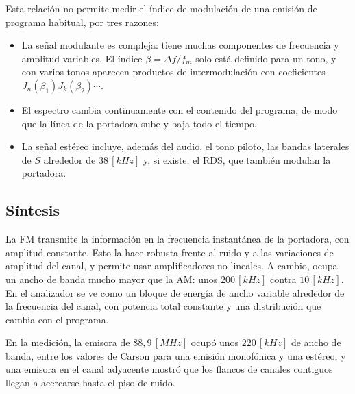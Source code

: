 Esta relación no permite medir el índice de modulación de una emisión de programa habitual, por tres razones:
\begin{itemize}
    \item La señal modulante es compleja: tiene muchas componentes de frecuencia y amplitud variables. El índice $\beta = \Delta f / f_m$ solo está definido para un tono, y con varios tonos aparecen productos de intermodulación con coeficientes $J_n(\beta_1) J_k(\beta_2) \cdots$.
    \item El espectro cambia continuamente con el contenido del programa, de modo que la línea de la portadora sube y baja todo el tiempo.
    \item La señal estéreo incluye, además del audio, el tono piloto, las bandas laterales de $S$ alrededor de $38 \, [kHz]$ y, si existe, el RDS, que también modulan la portadora.
\end{itemize}

\subsection{Síntesis}
La FM transmite la información en la frecuencia instantánea de la portadora, con amplitud constante. Esto la hace robusta frente al ruido y a las variaciones de amplitud del canal, y permite usar amplificadores no lineales. A cambio, ocupa un ancho de banda mucho mayor que la AM: unos $200 \, [kHz]$ contra $10 \, [kHz]$. En el analizador se ve como un bloque de energía de ancho variable alrededor de la frecuencia del canal, con potencia total constante y una distribución que cambia con el programa.

En la medición, la emisora de $88{,}9 \, [MHz]$ ocupó unos $220 \, [kHz]$ de ancho de banda, entre los valores de Carson para una emisión monofónica y una estéreo, y una emisora en el canal adyacente mostró que los flancos de canales contiguos llegan a acercarse hasta el piso de ruido.